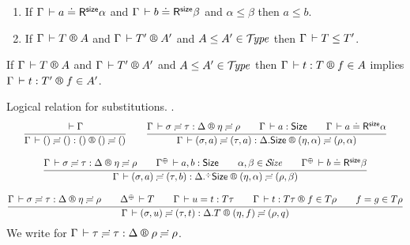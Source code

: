 \documentclass[acmlarge,review,anonymous]{acmart}\settopmatter{printfolios=true}
\newcommand{\LONGVERSION}[1]{}
\begin{document}
\begin{lemma}
\label{lem:lrsub}
\bla
\begin{enumerate}
\item
   If\/ $\Gamma \,\vdash a \doteq \mathsf{R}^{\mathsf{size}} \alpha$ and $\Gamma \,\vdash b \doteq \mathsf{R}^{\mathsf{size}} \beta$ and $\alpha \leq \beta$ then $a \leq b$.
\item
   If\/ $\RG \Gamma T A$ and $\RG \Gamma {T'} {A'}$ and $A \leq A' \in \mathcal{T}\!\mathit{ype}$ then $\Gamma \,\vdash T \leq T'$.
\end{enumerate}
\end{lemma}
\LONGVERSION{
\begin{proof}
  The proof is analogous to the one  for algorithmic subtyping to come (Lemma~\ref{lem:lrasub}).
\end{proof}
}

\begin{lemma}
\label{lem:lrsump}
   If\/ $\RG \Gamma T A$ and $\RG \Gamma {T'} {A'}$ and $A \leq A' \in \mathcal{T}\!\mathit{ype}$ then
   $\LR \Gamma t T f A$ implies $\LR \Gamma t {T'} f {A'}$.
\end{lemma}


Logical relation for substitutions.
\fbox{$\LRSub \Gamma \sigma \tau \Delta \eta \rho$}.
\begin{gather*}
  \ru{\der \Gamma
    }{\LRSub \Gamma {\sempty} {\sempty} {\cempty} {\sempty} {\sempty}}
\qquad
  \ru{\LRSub \Gamma \sigma \tau \Delta \eta \rho \qquad
      \Gamma \der a : \Size \qquad
      \LRSize \Gamma a \alpha
    }{\LRSub \Gamma {(\sigma,a)} {(\tau,a)} {\cext \Delta \Size} {(\eta,\alpha)} {(\rho,\alpha)}}
\\[2ex]
  \ru{\LRSub \Gamma \sigma \tau \Delta \eta \rho \qquad
      \resurrect \Gamma \der a, b : \Size \qquad
      \alpha,\beta \in \SIZE \qquad
      \LRSize {\resurrect\Gamma} b \beta
    }{\LRSub \Gamma {(\sigma,a)} {(\tau,b)} {\erext \Delta \Size} {(\eta,\alpha)} {(\rho,\beta)}}
\\[2ex]
  \ru{\LRSub \Gamma \sigma \tau \Delta \eta \rho \qquad
      \resurrect \Delta \der T \qquad
      \Gamma \der u = t : T\tau \qquad
      \LR \Gamma t {T \tau} f {T \rho} \qquad
      f = g \in T\rho
    }{\LRSub \Gamma {(\sigma,u)} {(\tau,t)} {\cext \Delta T} {(\eta,f)} {(\rho,q)}}
\end{gather*}
We write \fbox{$\LRS \Gamma \tau \Delta \rho$} for $\LRSub \Gamma \tau \tau \Delta \rho \rho$.
\end{document}
